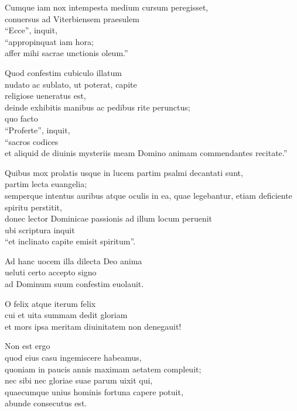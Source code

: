 \documentclass[a5paper,twoside]{article}
\begin{document}
Cumque iam nox intempesta medium cursum peregisset, \\
conuersus ad Viterbiensem praesulem \\
``Ecce'', inquit, \\
``appropinquat iam hora; \\
affer mihi sacrae unctionis oleum.''  

Quod confestim cubiculo illatum \\
nudato ac sublato, ut poterat, capite \\
religiose ueneratus est, \\
deinde exhibitis manibus ac pedibus rite perunctus; \\
quo facto \\
``Proferte'', inquit, \\
``sacros codices \\
et aliquid de diuinis mysteriis meam Domino animam commendantes recitate.''  

Quibus mox prolatis usque in lucem partim psalmi decantati sunt, \\
partim lecta euangelia; \\
semperque intentus auribus atque oculis in ea, quae legebantur, etiam deficiente spiritu perstitit, \\
donec lector Dominicae passionis ad illum locum peruenit \\
ubi scriptura inquit \\
``et inclinato capite emisit spiritum''.  

Ad hanc uocem illa dilecta Deo anima \\
ueluti certo accepto signo \\
ad Dominum suum confestim euolauit.

O felix atque iterum felix \\
cui et uita summam dedit gloriam \\
et mors ipsa meritam diuinitatem non denegauit!  

Non est ergo \\
quod eius casu ingemiscere habeamus, \\
quoniam in paucis annis maximam aetatem compleuit; \\
nec sibi nec gloriae suae parum uixit qui, \\
quaecumque unius hominis fortuna capere potuit, \\
abunde consecutus est.  
\end{document}

